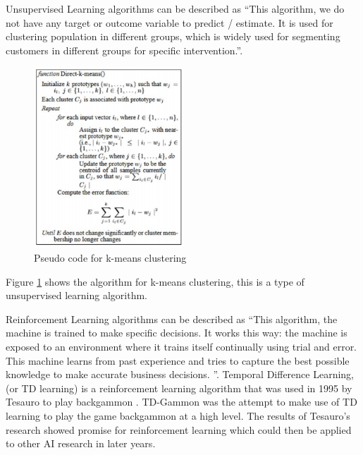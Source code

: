 \documentclass[10pt,a4paper]{scrartcl}
\begin{document}
		 Unsupervised Learning algorithms can be described as ``This algorithm, we do not have any target or outcome variable to predict / estimate.  It is used for clustering population in different groups, which is widely used for segmenting customers in different groups for specific intervention.''\cite{EssentialMachineLearningAlgorithms}.
\begin{figure}[H]
	\begin{center}
	\includegraphics[width=0.5\textwidth] {pseudoCodeKCluster.png}
	\caption{Pseudo code for k-means clustering \cite{MachineLearningAlgorithmsReview}}
	\label{KMeansClusteringPseudoCode}
	\end{center}
\end{figure}		 

Figure \ref{KMeansClusteringPseudoCode} shows the algorithm for k-means clustering, this is a type of unsupervised learning algorithm.

		  Reinforcement Learning algorithms can be described as ``This algorithm, the machine is trained to make specific decisions. It works this way: the machine is exposed to an environment where it trains itself continually using trial and error. This machine learns from past experience and tries to capture the best possible knowledge to make accurate business decisions. ''\cite{EssentialMachineLearningAlgorithms}.
Temporal Difference Learning, (or TD learning) is a reinforcement learning algorithm that was used in 1995 by Tesauro to play backgammon \cite{TDGammon}. TD-Gammon was the attempt to make use of TD learning to play the game backgammon at a high level. The results of Tesauro's research showed promise for reinforcement learning which could then be applied to other AI research in later years. 
\end{document}
